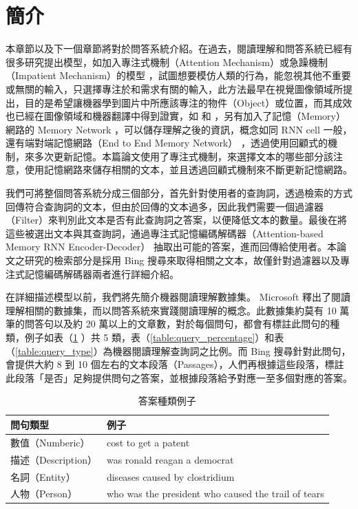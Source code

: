 \section{簡介}
本章節以及下一個章節將對於問答系統介紹。在過去，閱讀理解和問答系統已經有很多研究提出模型，如加入專注式機制（Attention Mechanism）或急躁機制（Impatient Mechanism）的模型 \cite{hermann2015teaching} ，試圖想要模仿人類的行為，能忽視其他不重要或無關的輸入，只選擇專注於和需求有關的輸入，此方法最早在視覺圖像領域所提出，目的是希望讓機器學到圖片中所應該專注的物件（Object）或位置，而其成效也已經在圖像領域和機器翻譯中得到證實，如 \cite{mnih2014recurrent} 和 \cite{bahdanau2014neural}，另有加入了記憶（Memory）網路的 Memory Network \cite{weston2014memory} ，可以儲存理解之後的資訊，概念如同 RNN cell 一般，還有端對端記憶網路（End to End Memory Network）\cite{sukhbaatar2015end} ，透過使用回顧式的機制，來多次更新記憶。本篇論文使用了專注式機制，來選擇文本的哪些部分該注意，使用記憶網路來儲存相關的文本，並且透過回顧式機制來不斷更新記憶網路。

我們可將整個問答系統分成三個部分，首先針對使用者的查詢詞，透過檢索的方式回傳符合查詢詞的文本，但由於回傳的文本過多，因此我們需要一個過濾器（Filter）來判別此文本是否有此查詢詞之答案，以便降低文本的數量。最後在將這些被選出文本與其查詢詞，通過專注式記憶編碼解碼器（Attention-based Memory RNN Encoder-Decoder）\cite{xiong2016dynamic} 抽取出可能的答案，進而回傳給使用者。本論文之研究的檢索部分是採用 Bing 搜尋來取得相關之文本，故僅針對過濾器以及專注式記憶編碼解碼器兩者進行詳細介紹。

在詳細描述模型以前，我們將先簡介機器閱讀理解數據集。 Microsoft 釋出了閱讀理解相關的數據集，而以問答系統來實踐閱讀理解的概念。此數據集約莫有 10 萬筆的問答句以及約 20 萬以上的文章數，對於每個問句，都會有標註此問句的種類，例子如表（\ref{table:query_example} ）共 5 類，表（\ref{table:query_percentage}）和表（\ref{table:query_type}）為機器閱讀理解查詢詞之比例。而 Bing 搜尋針對此問句，會提供大約 8 到 10 個左右的文本段落（Passages），人們再根據這些段落，標註此段落「是否」足夠提供問句之答案，並根據段落給予對應一至多個對應的答案。%

\begin{table}
    \caption{答案種類例子}
    \label{table:query_example}
    \centering
    \begin{tabular}[h]{|l|l|}
        \hline
        問句類型 & 例子\\
        \hline
        數值（Numberic） & cost to get a patent\\
        \hline
        描述（Description）& was ronald reagan a democrat\\
        \hline
        名詞（Entity） & diseases caused by clostridium\\
        \hline
        人物（Person） & who was the president who caused the trail of tears\\
        \hline
    \end{tabular}
\end{table}

